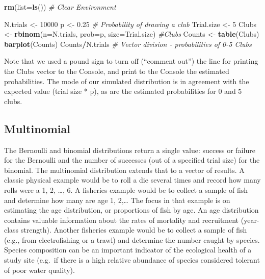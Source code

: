 \documentclass[
]{krantz}
\makeatletter
\newenvironment{Shaded}{\begin{snugshade}}{\end{snugshade}}
\newcommand{\AttributeTok}[1]{\textcolor[rgb]{0.27,0.27,0.27}{#1}}
\newcommand{\CommentTok}[1]{\textcolor[rgb]{0.37,0.37,0.37}{\textit{#1}}}
\newcommand{\DecValTok}[1]{\textcolor[rgb]{0.06,0.06,0.06}{#1}}
\newcommand{\FloatTok}[1]{\textcolor[rgb]{0.06,0.06,0.06}{#1}}
\newcommand{\FunctionTok}[1]{\textcolor[rgb]{0.27,0.27,0.27}{\textbf{#1}}}
\newcommand{\NormalTok}[1]{#1}
\newcommand{\OtherTok}[1]{\textcolor[rgb]{0.37,0.37,0.37}{#1}}
\newcommand{\SpecialCharTok}[1]{\textcolor[rgb]{0.43,0.43,0.43}{\textbf{#1}}}
\newenvironment{kframe}{%
\medskip{}
\setlength{\fboxsep}{.8em}
 \def\at@end@of@kframe{}%
 \ifinner\ifhmode%
  \def\at@end@of@kframe{\end{minipage}}%
  \begin{minipage}{\columnwidth}%
 \fi\fi%
 \def\FrameCommand##1{\hskip\@totalleftmargin \hskip-\fboxsep
 \colorbox{shadecolor}{##1}\hskip-\fboxsep
     \hskip-\linewidth \hskip-\@totalleftmargin \hskip\columnwidth}%
 \MakeFramed {\advance\hsize-\width
   \@totalleftmargin\z@ \linewidth\hsize
   \@setminipage}}%
 {\par\unskip\endMakeFramed%
 \at@end@of@kframe}
\renewenvironment{Shaded}{\begin{kframe}}{\end{kframe}}
\makeatother
\begin{document}
\begin{Shaded}
\begin{Highlighting}[]
\FunctionTok{rm}\NormalTok{(}\AttributeTok{list=}\FunctionTok{ls}\NormalTok{()) }\CommentTok{\# Clear Environment}

\NormalTok{N.trials }\OtherTok{\textless{}{-}} \DecValTok{10000}
\NormalTok{p }\OtherTok{\textless{}{-}} \FloatTok{0.25} \CommentTok{\# Probability of drawing a club}
\NormalTok{Trial.size }\OtherTok{\textless{}{-}} \DecValTok{5}
\NormalTok{Clubs }\OtherTok{\textless{}{-}} \FunctionTok{rbinom}\NormalTok{(}\AttributeTok{n=}\NormalTok{N.trials, }\AttributeTok{prob=}\NormalTok{p, }\AttributeTok{size=}\NormalTok{Trial.size)}
\CommentTok{\#Clubs}
\NormalTok{Counts }\OtherTok{\textless{}{-}} \FunctionTok{table}\NormalTok{(Clubs)}
\FunctionTok{barplot}\NormalTok{(Counts)}
\NormalTok{Counts}\SpecialCharTok{/}\NormalTok{N.trials }\CommentTok{\# Vector division {-} probabilities of 0{-}5 Clubs}
\end{Highlighting}
\end{Shaded}

Note that we used a pound sign to turn off (``comment out'') the line for printing the Clubs vector to the Console, and print to the Console the estimated probabilities. The mode of our simulated distribution is in agreement with the expected value (trial size * p), as are the estimated probabilities for 0 and 5 clubs.

\hypertarget{Multinomial}{%
\subsection{Multinomial}\label{Multinomial}}

The Bernoulli and binomial distributions return a single value: success or failure for the Bernoulli and the number of successes (out of a specified trial size) for the binomial. The multinomial distribution extends that to a vector of results. A classic physical example would be to roll a die several times and record how many rolls were a 1, 2, \ldots, 6. A fisheries example would be to collect a sample of fish and determine how many are age 1, 2,\ldots{} The focus in that example is on estimating the age distribution, or proportions of fish by age. An age distribution contains valuable information about the rates of mortality and recruitment (year-class strength). Another fisheries example would be to collect a sample of fish (e.g., from electrofishing or a trawl) and determine the number caught by species. Species composition can be an important indicator of the ecological health of a study site (e.g.~if there is a high relative abundance of species considered tolerant of poor water quality).
\end{document}
